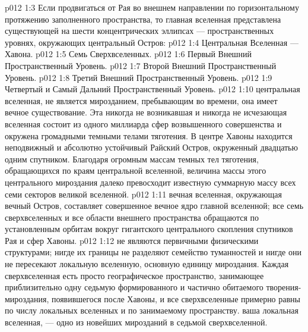 \vs p012 1:3 \pc Если продвигаться от Рая во внешнем направлении по горизонтальному протяжению заполненного пространства, то главная вселенная представлена существующей на шести концентрических эллипсах --- пространственных уровнях, окружающих центральный Остров:
\vs p012 1:4 \bibnobreakspace Центральная Вселенная --- Хавона.
\vs p012 1:5 \bibnobreakspace Семь Сверхвселенных.
\vs p012 1:6 \bibnobreakspace Первый Внешний Пространственный Уровень.
\vs p012 1:7 \bibnobreakspace Второй Внешний Пространственный Уровень.
\vs p012 1:8 \bibnobreakspace Третий Внешний Пространственный Уровень.
\vs p012 1:9 \bibnobreakspace Четвертый и Самый Дальний Пространственный Уровень.
\vs p012 1:10 \pc {} центральная вселенная, не является мирозданием, пребывающим во времени, она имеет вечное существование. Эта никогда не возникавшая и никогда не исчезающая вселенная состоит из одного миллиарда сфер возвышенного совершенства и окружена громадными темными телами тяготения. В центре Хавоны находится неподвижный и абсолютно устойчивый Райский Остров, окруженный двадцатью одним спутником. Благодаря огромным массам темных тел тяготения, обращающихся по краям центральной вселенной, величина массы этого центрального мироздания далеко превосходит известную суммарную массу всех семи секторов великой вселенной.
\vs p012 1:11 \pc {} вечная вселенная, окружающая вечный Остров, составляет совершенное вечное ядро главной вселенной; все семь сверхвселенных и все области внешнего пространства обращаются по установленным орбитам вокруг гигантского центрального скопления спутников Рая и сфер Хавоны.
\vs p012 1:12  не являются первичными физическими структурами; нигде их границы не разделяют семейство туманностей и нигде они не пересекают локальную вселенную, основную единицу мироздания. Каждая сверхвселенная есть просто географическое пространство, занимающее приблизительно одну седьмую формированного и частично обитаемого творения\hyp{}мироздания, появившегося после Хавоны, и все сверхвселенные примерно равны по числу локальных вселенных и по занимаемому пространству.  ваша локальная вселенная, --- одно из новейших мирозданий в  седьмой сверхвселенной.
